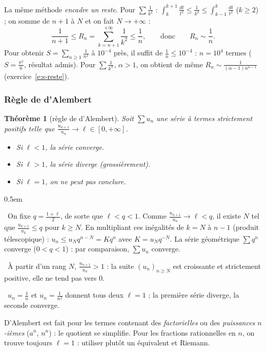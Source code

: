 \documentclass[a4paper,11pt]{article}
\makeatletter
\numberwithin{equation}{section}
\numberwithin{figure}{section}
\numberwithin{table}{section}
\theoremstyle{enonce}
\newtheorem{theoreme}[definition]{Théorème}
\theoremstyle{exemple}
\theoremstyle{remarque}
\renewcommand{\proofname}{Démonstration}
\renewenvironment{proof}[1][\proofname]{\par\pushQED{\qed}\normalfont
  \topsep0.5em\relax\trivlist\item[\hskip\labelsep\sffamily\itshape\color{Gris}#1.]\ignorespaces}
  {\popQED\endtrivlist\@endpefalse}
\newcommand{\etape}[1]{\par\smallskip\noindent{\sffamily\bfseries\small\color{BleuMoyen}#1.}\ }
\makeatother
\begin{document}
\begin{enpratique}
La même méthode \emph{encadre un reste}. Pour $\sum\frac1{k^2}$ : $\int_{k}^{k+1}\frac{dt}{t^2}\leq\frac1{k^2}\leq\int_{k-1}^{k}\frac{dt}{t^2}$
($k\geq2$) ; on somme de $n+1$ à $N$ et on fait $N\to+\infty$ :
\[\frac1{n+1}\leq R_n=\sum_{k=n+1}^{+\infty}\frac1{k^2}\leq\frac1n,\qquad\text{donc}\qquad R_n\sim\frac1n.\]
Pour obtenir $S=\sum_{n\geq1}\frac1{n^2}$ à $10^{-4}$ près, il suffit de $\frac1n\leq10^{-4}$ : $n=10^4$ termes ($S=\frac{\pi^2}6$,
résultat admis). Pour $\sum\frac1{k^\alpha}$, $\alpha>1$, on obtient de même $R_n\sim\frac1{(\alpha-1)n^{\alpha-1}}$
(exercice~\ref{e:s-reste}).
\end{enpratique}

\subsubsection*{Règle de d'Alembert}

\begin{theoreme}[règle de d'Alembert]\label{t:dalembert}
Soit $\sum u_n$ une série à termes \emph{strictement} positifs telle que $\frac{u_{n+1}}{u_n}\to\ell\in[0,+\infty]$.
\begin{itemize}
\item Si $\ell<1$, la série converge.
\item Si $\ell>1$, la série diverge (grossièrement).
\item Si $\ell=1$, on ne peut pas conclure.
\end{itemize}
\end{theoreme}

\begin{proof}
\etape{$\ell<1$}On fixe $q=\frac{1+\ell}2$, de sorte que $\ell<q<1$. Comme $\frac{u_{n+1}}{u_n}\to\ell<q$, il existe $N$ tel que
$\frac{u_{k+1}}{u_k}\leq q$ pour $k\geq N$. En multipliant ces inégalités de $k=N$ à $n-1$ (produit télescopique) :
$u_n\leq u_Nq^{n-N}=Kq^n$ avec $K=u_Nq^{-N}$. La série géométrique $\sum q^n$ converge ($0<q<1$) : par comparaison, $\sum u_n$
converge.

\etape{$\ell>1$}À partir d'un rang $N$, $\frac{u_{n+1}}{u_n}>1$ : la suite $(u_n)_{n\geq N}$ est croissante et strictement positive,
elle ne tend pas vers $0$.

\etape{$\ell=1$}$u_n=\frac1n$ et $u_n=\frac1{n^2}$ donnent tous deux $\ell=1$ ; la première série diverge, la seconde converge.
\end{proof}

\begin{enpratique}
D'Alembert est fait pour les termes contenant des \emph{factorielles} ou des \emph{puissances $n$-ièmes} ($a^n$, $n^n$) : le quotient
se simplifie. Pour les fractions rationnelles en $n$, on trouve toujours $\ell=1$ : utiliser plutôt un équivalent et Riemann.
\end{enpratique}
\end{document}
